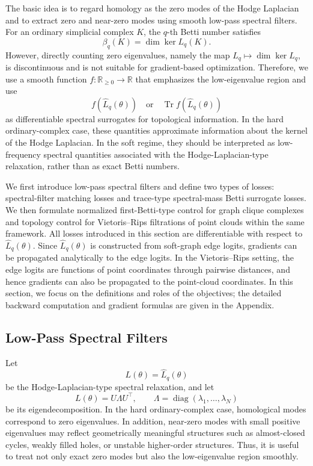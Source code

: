 \documentclass[pdflatex,sn-mathphys-ay]{sn-jnl}%
\theoremstyle{thmstyleone}%
\theoremstyle{thmstyletwo}%
\theoremstyle{thmstylethree}%
\begin{document}
The basic idea is to regard homology as the zero modes of the Hodge Laplacian and to extract zero and near-zero modes using smooth low-pass spectral filters.
For an ordinary simplicial complex \(K\), the \(q\)-th Betti number satisfies
\[
\beta_q(K)=\dim\ker L_q(K).
\]
However, directly counting zero eigenvalues, namely the map \(L_q\mapsto \dim\ker L_q\), is discontinuous and is not suitable for gradient-based optimization.
Therefore, we use a smooth function \(f:\mathbb{R}_{\ge0}\to\mathbb{R}\) that emphasizes the low-eigenvalue region and use
\[
f(\widehat{L}_q(\theta))
\quad\text{or}\quad
\operatorname{Tr}f(\widehat{L}_q(\theta))
\]
as differentiable spectral surrogates for topological information.
In the hard ordinary-complex case, these quantities approximate information about the kernel of the Hodge Laplacian. In the soft regime, they should be interpreted as low-frequency spectral quantities associated with the Hodge-Laplacian-type relaxation, rather than as exact Betti numbers.

We first introduce low-pass spectral filters and define two types of losses: spectral-filter matching losses and trace-type spectral-mass Betti surrogate losses.
We then formulate normalized first-Betti-type control for graph clique complexes and topology control for Vietoris--Rips filtrations of point clouds within the same framework.
All losses introduced in this section are differentiable with respect to \(\widehat{L}_q(\theta)\).
Since \(\widehat{L}_q(\theta)\) is constructed from soft-graph edge logits, gradients can be propagated analytically to the edge logits.
In the Vietoris--Rips setting, the edge logits are functions of point coordinates through pairwise distances, and hence gradients can also be propagated to the point-cloud coordinates.
In this section, we focus on the definitions and roles of the objectives; the detailed backward computation and gradient formulas are given in the Appendix.

\subsection{Low-Pass Spectral Filters}

Let
\[
L(\theta)=\widehat{L}_q(\theta)
\]
be the Hodge-Laplacian-type spectral relaxation, and let
\[
L(\theta)=U\Lambda U^\top,
\qquad
\Lambda=\operatorname{diag}(\lambda_1,\ldots,\lambda_N)
\]
be its eigendecomposition.
In the hard ordinary-complex case, homological modes correspond to zero eigenvalues. In addition, near-zero modes with small positive eigenvalues may reflect geometrically meaningful structures such as almost-closed cycles, weakly filled holes, or unstable higher-order structures. Thus, it is useful to treat not only exact zero modes but also the low-eigenvalue region smoothly.
\end{document}
